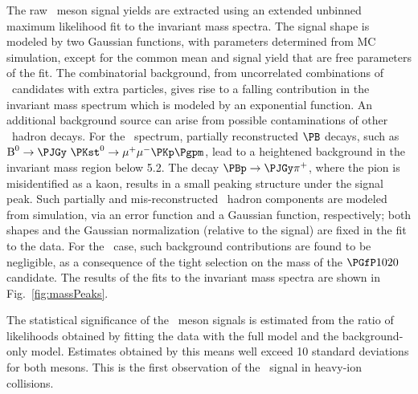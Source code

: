 The raw \PB\ meson signal yields are extracted using an extended unbinned maximum likelihood fit to the invariant mass spectra. %
%
The signal shape is modeled by two Gaussian functions, with parameters determined from MC simulation, except for the common mean and signal yield that are free parameters of the fit.
The combinatorial background, from uncorrelated combinations of \PJGy\ candidates with extra particles,
gives rise to a falling contribution in the invariant mass spectrum which is  modeled by an exponential function.
An additional background source can arise from possible contaminations of other \PB\ hadron decays.
For the \PBp\ spectrum, partially reconstructed $\PB$ decays, such as ${\text{B}}^{0} \to \PJGy~\PKst^0 \to \mu^{+}\mu^{-}\PKp\Pgpm$, lead to a heightened background in the invariant mass region below 5.2\GeVcc.
The decay $\PBp \rightarrow \PJGy \pi^{+}$, where the pion is misidentified as a kaon, results in a small peaking structure under the signal peak.
Such partially and mis-reconstructed \PB\ hadron components are modeled from simulation, via an error function and a Gaussian function, respectively; both shapes and the Gaussian normalization (relative to the signal) are fixed in the fit to the data.   
For the \PBzs\ case, such background contributions are found to be negligible, as a consequence of the tight selection on the mass of the $\Pphi$ candidate.
%
%
The results of the fits to the invariant mass spectra are shown in Fig.~\ref{fig:massPeaks}.

The statistical significance of the \PB\ meson signals is estimated from the ratio of likelihoods obtained by fitting the data with the full model and the background-only model. Estimates obtained by this means well exceed 10 standard deviations for both mesons.  
This is the first observation of the \PBzs\ signal in heavy-ion collisions. 

